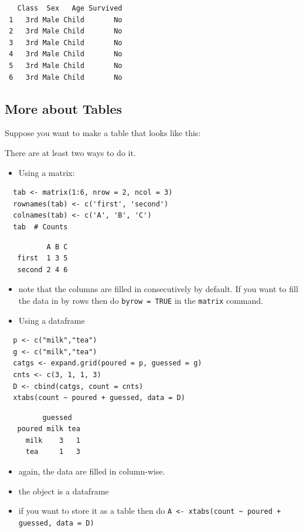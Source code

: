 \documentclass[captions=tableheading]{scrbook}
\begin{document}
\begin{example}
\begin{verbatim}
   Class  Sex   Age Survived
 1   3rd Male Child       No
 2   3rd Male Child       No
 3   3rd Male Child       No
 4   3rd Male Child       No
 5   3rd Male Child       No
 6   3rd Male Child       No
\end{verbatim}
\subsection{More about Tables}
\label{sec-20-1-6}

Suppose you want to make a table that looks like this:

There are at least two ways to do it.

\begin{itemize}
\item Using a matrix:
\end{itemize}

\lstset{language=R}
\begin{lstlisting}
  tab <- matrix(1:6, nrow = 2, ncol = 3)
  rownames(tab) <- c('first', 'second')
  colnames(tab) <- c('A', 'B', 'C')
  tab  # Counts
\end{lstlisting}

\begin{verbatim}
          A B C
   first  1 3 5
   second 2 4 6
\end{verbatim}

\begin{itemize}
\item note that the columns are filled in consecutively by default. If you want to fill the data in by rows then do \texttt{byrow = TRUE} in the \texttt{matrix} command.
\item Using a dataframe
\end{itemize}

\lstset{language=R}
\begin{lstlisting}
  p <- c("milk","tea")
  g <- c("milk","tea")
  catgs <- expand.grid(poured = p, guessed = g)
  cnts <- c(3, 1, 1, 3)
  D <- cbind(catgs, count = cnts)
  xtabs(count ~ poured + guessed, data = D)
\end{lstlisting}

\begin{verbatim}
         guessed
   poured milk tea
     milk    3   1
     tea     1   3
\end{verbatim}

\begin{itemize}
\item again, the data are filled in column-wise.
\item the object is a dataframe
\item if you want to store it as a table then do \texttt{A <- xtabs(count \textasciitilde{} poured + guessed, data = D)}
\end{itemize}

\end{example}
\end{document}
